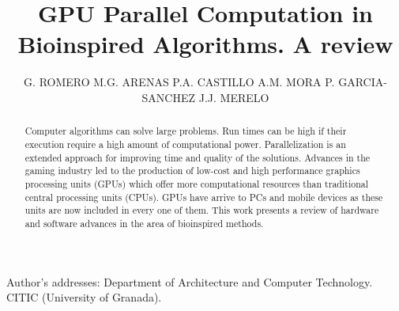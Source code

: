 \documentclass[prodmode,acmtecs]{acmsmall}
\begin{document}

\title{GPU Parallel Computation in Bioinspired Algorithms. A review}


\author{G. ROMERO 
M.G. ARENAS 
P.A. CASTILLO 
A.M. MORA 
P. GARCIA-SANCHEZ 
J.J. MERELO }



\begin{abstract}
Computer algorithms can solve large problems. Run times can be high if their execution require a high amount of computational power. Parallelization is an extended approach for improving time and quality of the solutions. Advances in the gaming industry led to the production of low-cost and high performance graphics processing units (GPUs) which offer more computational resources than traditional central processing units (CPUs). GPUs have arrive to PCs and mobile devices as these units are now included in every one of them. This work presents a review of hardware and software advances in the area of bioinspired methods.
\end{abstract}






\begin{bottomstuff}
Author's addresses: Department of Architecture and Computer Technology. CITIC (University of Granada).
\end{bottomstuff}
\end{document}
